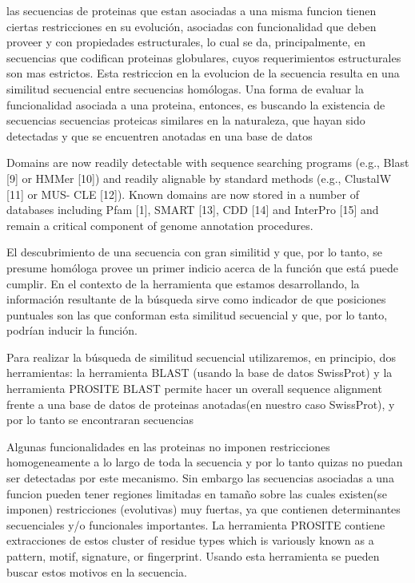 las secuencias de proteinas que estan asociadas a una misma funcion tienen ciertas restricciones en su evolución, 
asociadas con funcionalidad que deben proveer y con propiedades estructurales, lo cual se da, 
principalmente, en secuencias que codifican proteinas globulares, cuyos requerimientos estructurales son mas estrictos. 
Esta restriccion en la evolucion de la secuencia resulta en una similitud secuencial entre secuencias homólogas.
Una forma de evaluar la funcionalidad asociada a una proteina, entonces, es buscando la existencia de secuencias secuencias proteicas similares en la naturaleza, que hayan sido detectadas y que se encuentren anotadas en una base de datos

Domains are now readily detectable with sequence searching programs (e.g., Blast [9] or HMMer [10]) and readily alignable by standard methods (e.g., ClustalW [11] or MUS-
CLE [12]). Known domains are now stored in a number of databases including Pfam [1], SMART [13], CDD [14] and
InterPro [15] and remain a critical component of genome annotation procedures. 

El descubrimiento de una secuencia con gran similitid y que, por lo tanto, se presume homóloga provee un primer indicio acerca de la función que está puede cumplir. 
En el contexto de la herramienta que estamos desarrollando, la información resultante de la búsqueda sirve como indicador de que posiciones puntuales son las que conforman esta similitud secuencial y que, por lo tanto, podrían inducir la función. 

Para realizar la búsqueda de similitud secuencial utilizaremos, en principio, dos herramientas:  
la herramienta BLAST (usando la base de datos SwissProt) y la herramienta PROSITE
BLAST permite hacer un overall sequence alignment frente a una base de datos de proteinas anotadas(en nuestro caso SwissProt), y por lo tanto se encontraran secuencias 

Algunas funcionalidades en las proteinas no imponen restricciones homogeneamente a lo largo de toda la secuencia y por lo tanto quizas no puedan ser detectadas por este mecanismo.
Sin embargo las secuencias asociadas a una funcion pueden tener regiones limitadas en tamaño sobre las cuales existen(se imponen) restricciones (evolutivas) muy fuertas, ya que contienen determinantes secuenciales y/o funcionales importantes.
La herramienta PROSITE contiene extracciones de estos cluster of residue types which is variously known as a pattern, motif, signature, or fingerprint. 
Usando esta herramienta se pueden buscar estos motivos en la secuencia. 

